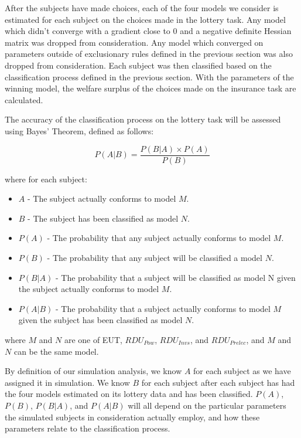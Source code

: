 \documentclass[11pt,a4paper]{report}
\begin{document}
After the subjects have made choices, each of the four models we consider is estimated for each subject on the choices made in the lottery task.
Any model which didn't converge with a gradient close to 0 and a negative definite Hessian matrix was dropped from consideration.
Any model which converged on parameters outside of exclusionary rules defined in the previous section was also dropped from consideration.
Each subject was then classified based on the classification process defined in the previous section.
With the parameters of the winning model, the welfare surplus of the choices made on the insurance task are calculated.

The accuracy of the classification process on the lottery task will be assessed using Bayes' Theorem, defined as follows:

\begin{equation}
	\label{eq4:bayes}
	P(A|B) = \frac{P(B|A) \times P(A)}{P(B)}
\end{equation}

\noindent where for each subject:

\begin{itemize}
	\item $A$ - The subject actually conforms to model $M$.
	\item $B$ - The subject has been classified as model $N$.
	\item $P(A)$ - The probability that any subject actually conforms to model $M$.
	\item $P(B)$ - The probability that any subject will be classified a model $N$.
	\item $P(B|A)$ - The probability that a subject will be classified as model N given the subject actually conforms to model $M$.
	\item $P(A|B)$ - The probability that a subject actually conforms to model $M$ given the subject has been classified as model $N$.
\end{itemize}

\noindent where $M$ and $N$ are one of EUT, $\mathit{RDU_{Pow}}$, $\mathit{RDU_{Invs}}$, and $\mathit{RDU_{Prelec}}$, and $M$ and $N$ can be the same model.

By definition of our simulation analysis, we know $A$ for each subject as we have assigned it in simulation.
We know $B$ for each subject after each subject has had the four models estimated on its lottery data and has been classified.
$P(A)$, $P(B)$, $P(B|A)$, and $P(A|B)$ will all depend on the particular parameters the simulated subjects in consideration actually employ, and how these parameters relate to the classification process.
\end{document}
